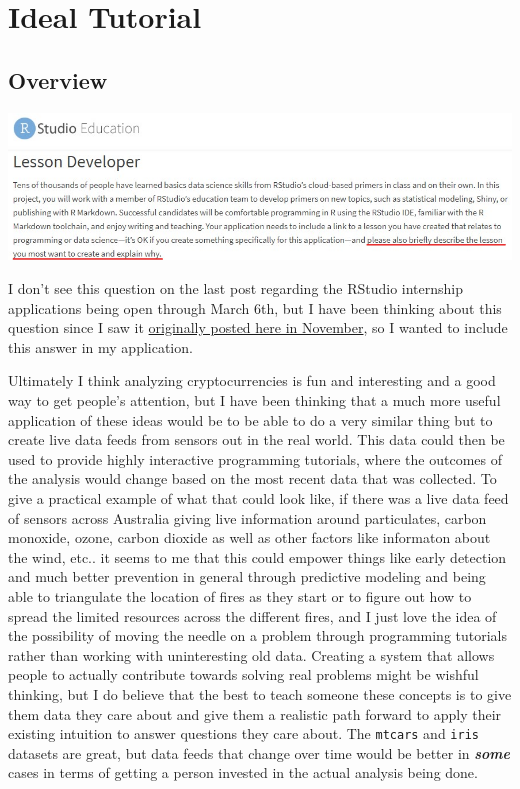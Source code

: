 \documentclass[
]{book}
\begin{document}
\hypertarget{ideal-tutorial}{%
\chapter{Ideal Tutorial}\label{ideal-tutorial}}

\hypertarget{overview-1}{%
\section{Overview}\label{overview-1}}

\includegraphics{images/idealTutorial.png}

I don't see this question on the last post regarding the RStudio internship applications being open through March 6th, but I have been thinking about this question since I saw it \href{https://education.rstudio.com/blog/2019/11/rstudio-internships-2020-preview/}{originally posted here in November}, so I wanted to include this answer in my application.

Ultimately I think analyzing cryptocurrencies is fun and interesting and a good way to get people's attention, but I have been thinking that a much more useful application of these ideas would be to be able to do a very similar thing but to create live data feeds from sensors out in the real world. This data could then be used to provide highly interactive programming tutorials, where the outcomes of the analysis would change based on the most recent data that was collected. To give a practical example of what that could look like, if there was a live data feed of sensors across Australia giving live information around particulates, carbon monoxide, ozone, carbon dioxide as well as other factors like informaton about the wind, etc.. it seems to me that this could empower things like early detection and much better prevention in general through predictive modeling and being able to triangulate the location of fires as they start or to figure out how to spread the limited resources across the different fires, and I just love the idea of the possibility of moving the needle on a problem through programming tutorials rather than working with uninteresting old data. Creating a system that allows people to actually contribute towards solving real problems might be wishful thinking, but I do believe that the best to teach someone these concepts is to give them data they care about and give them a realistic path forward to apply their existing intuition to answer questions they care about. The \texttt{mtcars} and \texttt{iris} datasets are great, but data feeds that change over time would be better in \textbf{\emph{some}} cases in terms of getting a person invested in the actual analysis being done.
\end{document}
